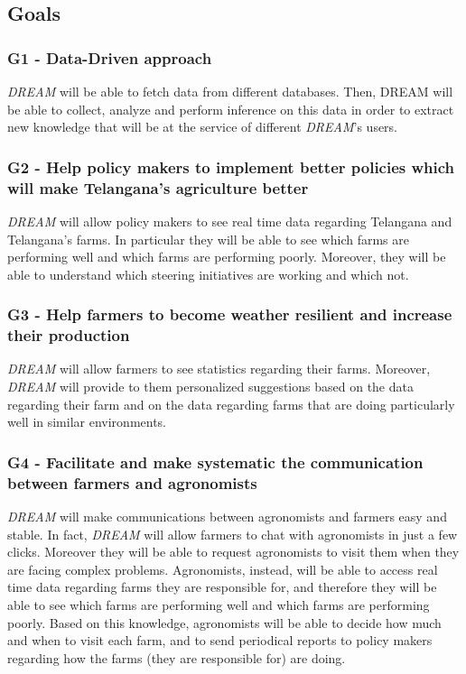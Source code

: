 \documentclass[10pt]{report}
\begin{document}
    \subsection{Goals}
    \subsubsection{G1 - Data-Driven approach}
    \emph{DREAM} will be able to fetch data from different databases. Then, DREAM will be able to collect, analyze and perform inference on this data in order to extract new knowledge that will be at the service of different \emph{DREAM}’s users.
    \subsubsection{G2 - Help policy makers to implement better policies which will make Telangana’s agriculture better}
    \emph{DREAM} will allow policy makers to see real time data regarding Telangana and Telangana’s farms. In particular they will be able to see which farms are performing well and which farms are performing poorly. Moreover, they will be able to understand which steering initiatives are working and which not.
    \subsubsection{G3 - Help farmers to become weather resilient and increase their production}
    \emph{DREAM} will allow farmers to see statistics regarding their farms. Moreover, \emph{DREAM} will provide to them personalized suggestions based on the data regarding their farm and on the data regarding farms that are doing particularly well in similar environments.
    \subsubsection{G4 - Facilitate and make systematic the communication between farmers and agronomists}
    \emph{DREAM} will make communications between agronomists and farmers easy and stable. In fact, \emph{DREAM} will allow farmers to chat with agronomists in just a few clicks. Moreover they will be able to request agronomists to visit them when they are facing complex problems.
    Agronomists, instead, will be able to access real time data regarding farms they are responsible for, and therefore they will be able to see which farms are performing well and which farms are performing poorly. Based on this knowledge, agronomists will be able to decide how much and when to visit each farm, and to send periodical reports to policy makers regarding how the farms (they are responsible for) are doing.
\end{document}

